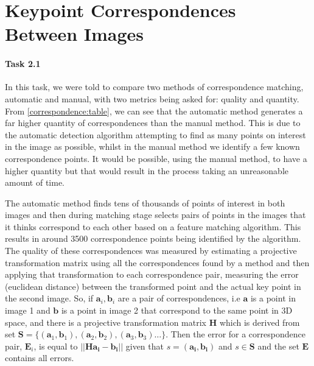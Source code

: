 \section{Keypoint Correspondences Between Images}

\paragraph{Task 2.1} In this task, we were told to compare two methods of correspondence matching, automatic and manual, with two metrics being asked for: quality and quantity. From \autoref{correspondence:table}, we can see that the automatic method generates a far higher quantity of correspondences than the manual method. This is due to the automatic detection algorithm attempting to find as many points on interest in the image as possible, whilst in the manual method we identify a few known correspondence points. It would be possible, using the manual method, to have a higher quantity but that would result in the process taking an unreasonable amount of time. 

The automatic method finds tens of thousands of points of interest in both images and then during matching stage selects pairs of points in the images that it thinks correspond to each other based on a feature matching algorithm. This results in around 3500 correspondence points being identified by the algorithm. The quality of these correspondences was measured by estimating a projective transformation matrix using all the correspondences found by a method and then applying that transformation to each correspondence pair, measuring the error (euclidean distance) between the transformed point and the actual key point in the second image. So, if $\mathbf{a}_i, \mathbf{b}_i$ are a pair of correspondences, i.e $\mathbf{a}$ is a point in image 1 and $\mathbf{b}$ is a point in image 2 that correspond to the same point in 3D space, and there is a projective transformation matrix $\mathbf{H}$ which is derived from set $\mathbf{S} = \{(\mathbf{a}_1, \mathbf{b}_1), (\mathbf{a}_2, \mathbf{b}_2), (\mathbf{a}_3, \mathbf{b}_3) \dots\} $. Then the error for a correspondence pair, $\mathbf{E}_i$, is equal to $||\mathbf{Ha_i} - \mathbf{b_i}|| $ given that $ s = (\mathbf{a_i}, \mathbf{b_i}) $ and $ s \in \mathbf{S}$ and the set $\mathbf{E}$ contains all errors.

